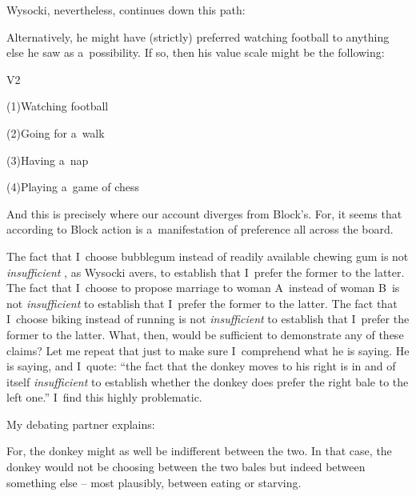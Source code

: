 Wysocki, nevertheless, continues down this path:



Alternatively, he might have (strictly) preferred watching football to anything else he saw as a~possibility. If so, then his value scale might be the following:



V2



(1)Watching football



(2)Going for a~walk



(3)Having a~nap



(4)Playing a~game of chess



And this is precisely where our account diverges from Block's. For, it seems that according to Block action is a~manifestation of preference all across the board.



The fact that I~choose bubblegum instead of readily available chewing gum is not \textit{insufficient} , as Wysocki avers, to establish that I~prefer the former to the latter. The fact that I~choose to propose marriage to woman A~instead of woman B~is not \textit{insufficient} to establish that I~prefer the former to the latter. The fact that I~choose biking instead of running is not \textit{insufficient} to establish that I~prefer the former to the latter. What, then, would be sufficient to demonstrate any of these claims? Let me repeat that just to make sure I~comprehend what he is saying. He is saying, and I~quote: ``the fact that the donkey moves to his right is in and of itself \textit{insufficient} to establish whether the donkey does prefer the right bale to the left one.'' I~find this highly problematic.



My debating partner explains:



For, the donkey might as well be indifferent between the two. In that case, the donkey would not be choosing between the two bales but indeed between something else -- most plausibly, between eating or starving.



